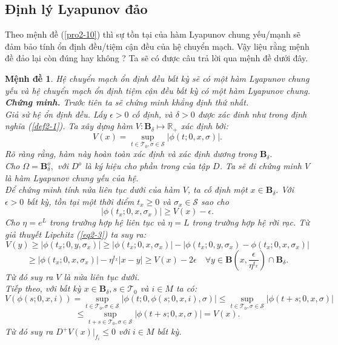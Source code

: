 \documentclass[14pt,a4paper,oneside]{report}		%
\newtheorem{proposition}[theorem]{Mệnh đề}
\begin{document}
\subsection{Định lý Lyapunov đảo}
Theo mệnh đề (\ref{pro2-10}) thì sự tồn tại của hàm Lyapunov chung yếu/mạnh sẽ đảm bảo tính ổn định đều/tiệm cận đều của hệ chuyển mạch. Vậy liệu rằng mệnh đề đảo lại còn đúng hay không ? Ta sẽ có được câu trả lời qua mệnh đề dưới đây.
\begin{proposition} \label{pro2-11}
Hệ chuyển mạch ổn định đều bất kỳ sẽ có một hàm Lyapunov chung yếu và hệ chuyển mạch ổn định tiệm cận đều bất kỳ có một hàm Lyapunov chung.\\
\textbf{Chứng minh.} Trước tiên ta sẽ chứng minh khẳng định thứ nhất.\\
Giả sử hệ ổn định đều. Lấy $\epsilon >0$ cố định, và $\delta >0$ được xác đinh như trong định nghĩa (\ref{def2-1}). Ta xây dựng hàm $V:\mathbf{B}_\delta\mapsto\mathbb{R}_+$ xác định bởi:
\begin{equation} \label{eq2-13}
V(x) = \sup_{t\in\mathcal{T}_0,\sigma\in\mathcal{S}}|\phi(t;0,x,\sigma)|.
\end{equation}
Rõ ràng rằng, hàm này hoàn toàn xác định và xác định dương trong $\mathbf{B}_\delta.$\\
Cho $\Omega=\mathbf{B}_\delta^o,$ với $D^o$ là ký hiệu cho phần trong của tập $D$. Ta sẽ đi chứng minh $V$ là hàm Lyapunov chung yếu của hệ.\\

Để chứng minh tính nửa liên tục dưới của hàm $V$, ta cố định một $x\in\mathbf{B}_\delta.$ Với $\epsilon >0$ bất kỳ, tồn tại một thời điểm $t_x\geq 0$ và $\sigma_x\in\mathcal{S}$ sao cho
$$|\phi(t_x;0,x,\sigma_x)|\geq V(x)-\epsilon.$$
Cho $\eta = e^L$ trong trường hợp hệ liên tục và $\eta = L$ trong trường hợp hệ rời rạc. Từ giả thuyết Lipchitz (\ref{eq2-3}) ta suy ra:
$$V(y)\geq |\phi(t_x;0,y,\sigma_x)|\geq|\phi(t_x;0,x,\sigma_x)|-|\phi(t_x;0,y,\sigma_x)-\phi(t_x;0,x,\sigma_x)|$$
$$\geq |\phi(t_x;0,x,\sigma_x)|-\eta^{t_x}|x-y|\geq V(x)-2\epsilon\quad\forall y\in\mathbf{B}(x,\frac{\epsilon}{\eta^{t_x}})\cap\mathbf{B}_\delta.$$
Từ đó suy ra $V$ là nửa liên tục dưới.\\

Tiếp theo, với bất kỳ $x\in\mathbf{B}_\delta, s\in\mathcal{T}_0$ và $i\in M$ ta có:
$$V(\phi(s;0,x,i))=\sup_{t\in\mathcal{T}_0,\sigma\in\mathcal{S}}|\phi(t;0,\phi(s;0,x,i),\sigma)|\leq\sup_{t\in\mathcal{T}_0,\sigma\in\mathcal{S}}|\phi(t+s;0,x,\sigma)|$$
$$\leq\sup_{t+s\in\mathcal{T}_0,\sigma\in\mathcal{S}}|\phi(t+s;0,x,\sigma)|=V(x).$$
Từ đó suy ra $D^+V(x)|_{f_i}\leq 0$ với $i\in M$ bất kỳ.\\


\end{proposition}
\end{document}

